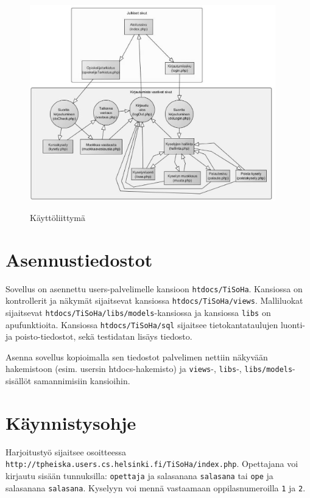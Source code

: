 \documentclass[12pt,twoside,a4paper,leqno,titlepage]{article}
\begin{document}
\begin{figure}[!h]
  \centering
  \includegraphics[width=0.95\textwidth]{kayttoliittyma.eps}\\
  \caption{Käyttöliittymä}
\end{figure}


\section{Asennustiedostot}

Sovellus on asennettu users-palvelimelle kansioon \verb'htdocs/TiSoHa'. Kansiossa
on kontrollerit ja näkymät sijaitsevat kansiossa \verb'htdocs/TiSoHa/views'. Malliluokat
sijaitsevat \verb'htdocs/TiSoHa/libs/models'-kansiossa ja kansiossa \verb'libs' on
apufunktioita. Kansiossa \verb'htdocs/TiSoHa/sql' sijaitsee tietokantataulujen 
luonti- ja poisto-tiedostot, sekä testidatan lisäys tiedosto.

Asenna sovellus kopioimalla sen tiedostot palvelimen nettiin näkyvään hakemistoon 
(esim. usersin htdocs-hakemisto) ja \verb'views'-, \verb'libs'-, \verb'libs/models'- 
sisällöt samannimisiin kansioihin. 

\section{Käynnistysohje}

Harjoitustyö sijaitsee osoitteessa\\ \verb"http://tpheiska.users.cs.helsinki.fi/TiSoHa/index.php".
Opettajana voi kirjautu sisään tunnuksilla: \verb'opettaja' ja salasanana \verb'salasana'
tai \verb'ope' ja salasanana \verb'salasana'. Kyselyyn voi mennä vastaamaan
oppilasnumeroilla \verb'1' ja \verb'2'.
\end{document}

